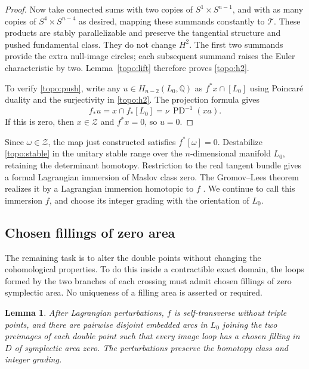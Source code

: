 \documentclass[11pt]{article}
\numberwithin{equation}{section}
\newtheorem{lemma}[theorem]{Lemma}
\theoremstyle{definition}
\theoremstyle{remark}
\newcommand{\Q}{\mathbb Q}
\DeclareMathOperator{\PD}{PD}
\begin{document}
\begin{proof}
Now take connected sums with two copies of $S^1\times S^{n-1}$,
and with as many copies of $S^4\times S^{n-4}$ as desired, mapping
these summands constantly to $\mathscr T$.  These products are
stably parallelizable and preserve the tangential structure and
pushed fundamental class.  They do not change $H^2$.  The first
two summands provide the extra null-image circles; each subsequent
summand raises the Euler characteristic by two.  Lemma~\ref{topo:lift}
therefore proves \eqref{topo:h2}.

To verify \eqref{topo:push}, write any $u\in H_{n-2}(L_0,\Q)$ as
$f^*x\cap[L_0]$ using Poincar\'e duality and the surjectivity in
\eqref{topo:h2}.  The projection formula gives
\[
 f_*u=x\cap f_*[L_0]=\nu\,\PD^{-1}(xa).
\]
If this is zero, then $x\in\mathcal Z$ and $f^*x=0$, so $u=0$.
\end{proof}

Since $\omega\in\mathcal Z$, the map just constructed satisfies
$f^*[\omega]=0$.  Destabilize \eqref{topo:stable} in the unitary
stable range over the $n$-dimensional manifold $L_0$, retaining the
determinant homotopy.  Restriction to the real tangent bundle gives
a formal Lagrangian immersion of Maslov class zero.  The
Gromov--Lees theorem realizes it by a Lagrangian immersion homotopic
to $f$ \cite{GromovLees,RathelFournier2024}.  We continue to call
this immersion $f$, and choose its integer grading with the
orientation of $L_0$.

\subsection{Chosen fillings of zero area}

The remaining task is to alter the double points without changing
the cohomological properties.  To do this inside a contractible
exact domain, the loops formed by the two branches of each crossing
must admit chosen fillings of zero symplectic area.  No uniqueness
of a filling area is asserted or required.

\begin{lemma}\label{topo:zero-actions}
After Lagrangian perturbations, $f$ is self-transverse without triple
points, and there are pairwise disjoint embedded arcs in $L_0$
joining the two preimages of each double point such that every
image loop has a chosen filling in $D$ of symplectic area zero.
The perturbations preserve the homotopy class and integer grading.
\end{lemma}
\end{document}
